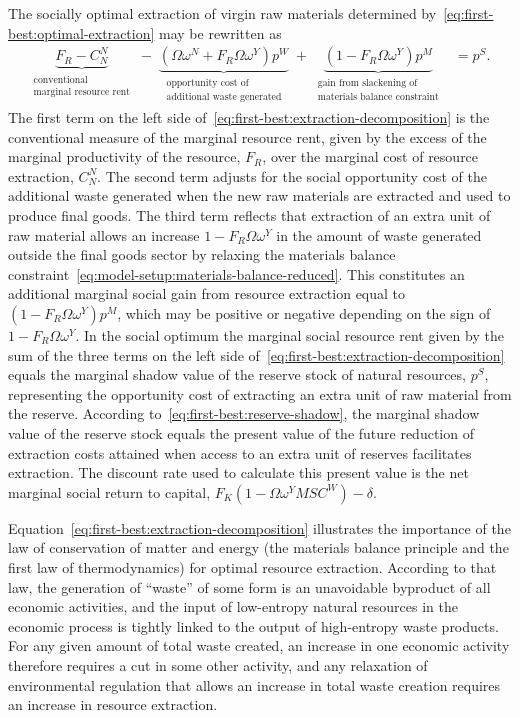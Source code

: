The socially optimal extraction of virgin raw materials determined by~\eqref{eq:first-best:optimal-extraction} may be rewritten as
\begin{align}
\underbrace{F_R - C_N^N}_{\substack{\text{conventional} \\ \text{marginal resource rent}}}
\;-\;
\underbrace{\left(\Omega\omega^N + F_R\Omega\omega^Y\right)p^W}_{\substack{\text{opportunity cost of} \\ \text{additional waste generated}}}
\;+\;
\underbrace{\left(1-F_R\Omega\omega^Y\right)p^M}_{\substack{\text{gain from slackening of} \\ \text{materials balance constraint}}}
&= p^S.
\label{eq:first-best:extraction-decomposition}
\end{align}
The first term on the left side of~\eqref{eq:first-best:extraction-decomposition} is the conventional measure of the marginal resource rent, given by the excess of the marginal productivity of the resource, $F_R$, over the marginal cost of resource extraction, $C_N^N$. The second term adjusts for the social opportunity cost of the additional waste generated when the new raw materials are extracted and used to produce final goods. The third term reflects that extraction of an extra unit of raw material allows an increase $1-F_R\Omega\omega^Y$ in the amount of waste generated outside the final goods sector by relaxing the materials balance constraint~\eqref{eq:model-setup:materials-balance-reduced}. This constitutes an additional marginal social gain from resource extraction equal to $\left(1-F_R\Omega\omega^Y\right)p^M$, which may be positive or negative depending on the sign of $1-F_R\Omega\omega^Y$. In the social optimum the marginal social resource rent given by the sum of the three terms on the left side of~\eqref{eq:first-best:extraction-decomposition} equals the marginal shadow value of the reserve stock of natural resources, $p^S$, representing the opportunity cost of extracting an extra unit of raw material from the reserve. According to~\eqref{eq:first-best:reserve-shadow}, the marginal shadow value of the reserve stock equals the present value of the future reduction of extraction costs attained when access to an extra unit of reserves facilitates extraction. The discount rate used to calculate this present value is the net marginal social return to capital, $F_K\left(1-\Omega\omega^Y MSC^W\right) - \delta$.

Equation~\eqref{eq:first-best:extraction-decomposition} illustrates the importance of the law of conservation of matter and energy (the materials balance principle and the first law of thermodynamics) for optimal resource extraction. According to that law, the generation of ``waste'' of some form is an unavoidable byproduct of all economic activities, and the input of low-entropy natural resources in the economic process is tightly linked to the output of high-entropy waste products. For any given amount of total waste created, an increase in one economic activity therefore requires a cut in some other activity, and any relaxation of environmental regulation that allows an increase in total waste creation requires an increase in resource extraction.

